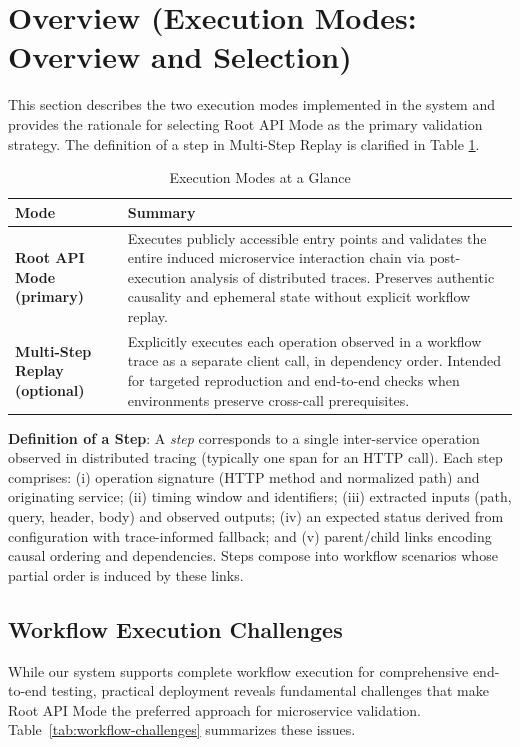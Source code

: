 \documentclass[conference]{IEEEtran}
\begin{document}
\section{Overview (Execution Modes: Overview and Selection)}\label{sec:overview}
This section describes the two execution modes implemented in the system and provides the rationale for selecting Root API Mode as the primary validation strategy. The definition of a step in Multi-Step Replay is clarified in Table \ref{tab:exec-modes}.

\begin{table}[t]
\centering
\caption{Execution Modes at a Glance}
\label{tab:exec-modes}
\renewcommand{\arraystretch}{1.15}\setlength{\tabcolsep}{4pt}
\begin{tabularx}{\columnwidth}{>{\bfseries}p{} X}
\toprule
Mode & Summary \\
\midrule
Root API Mode (primary) & Executes publicly accessible entry points and validates the entire induced microservice interaction chain via post-execution analysis of distributed traces. Preserves authentic causality and ephemeral state without explicit workflow replay. \\
Multi-Step Replay (optional) & Explicitly executes each operation observed in a workflow trace as a separate client call, in dependency order. Intended for targeted reproduction and end-to-end checks when environments preserve cross-call prerequisites. \\
\bottomrule
\end{tabularx}
\end{table}

\textbf{Definition of a Step}:
A \emph{step} corresponds to a single inter-service operation observed in distributed tracing (typically one span for an HTTP call). Each step comprises: (i) operation signature (HTTP method and normalized path) and originating service; (ii) timing window and identifiers; (iii) extracted inputs (path, query, header, body) and observed outputs; (iv) an expected status derived from configuration with trace-informed fallback; and (v) parent/child links encoding causal ordering and dependencies. Steps compose into workflow scenarios whose partial order is induced by these links.

\subsection{Workflow Execution Challenges}\label{ssec:workflow-challenges}
While our system supports complete workflow execution for comprehensive end-to-end testing, practical deployment reveals fundamental challenges that make Root API Mode the preferred approach for microservice validation. Table~\ref{tab:workflow-challenges} summarizes these issues.
\end{document}
